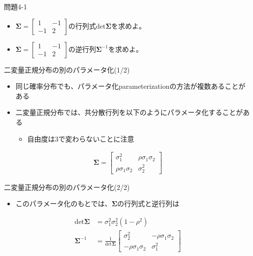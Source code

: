 \documentclass[aspectratio=169,unicode,dvipdfmx,14pt]{beamer}
\begin{document}
\begin{frame}{問題4-1}
\begin{itemize}
\item $\bm{\Sigma} = \begin{bmatrix} 1 & -1 \\ -1 & 2 \end{bmatrix}$の行列式$\mbox{det}\bm{\Sigma}$を求めよ。
\item $\bm{\Sigma} = \begin{bmatrix} 1 & -1 \\ -1 & 2 \end{bmatrix}$の逆行列$\bm{\Sigma}^{-1}$を求めよ。
\end{itemize}
\end{frame}

\begin{frame}{二変量正規分布の別のパラメータ化(1/2)}
\begin{itemize}
\item 同じ確率分布でも、パラメータ化parameterizationの方法が複数あることがある
\item 二変量正規分布では、共分散行列を以下のようにパラメータ化することがある
\begin{itemize}
\item 自由度は3で変わらないことに注意
\end{itemize}
\end{itemize}
\begin{align}
\bm{\Sigma} = \begin{bmatrix} \sigma_1^2 & \rho\sigma_1\sigma_2 \\
\rho\sigma_1\sigma_2 & \sigma_2^2 \end{bmatrix}
\end{align}
\end{frame}

\begin{frame}{二変量正規分布の別のパラメータ化(2/2)}
\begin{itemize}
\item このパラメータ化のもとでは、$\bm{\Sigma}$の行列式と逆行列は
\end{itemize}
\begin{align}
\mbox{det}\bm{\Sigma} &= \sigma_1^2\sigma_2^2(1-\rho^2) \\
\bm{\Sigma}^{-1} &= \frac{1}{\mbox{det}\bm{\Sigma}}
\begin{bmatrix} \sigma_2^2 & -\rho\sigma_1\sigma_2 \\ -\rho\sigma_1\sigma_2 & \sigma_1^2 \end{bmatrix}
\end{align}
\end{frame}
\end{document}
